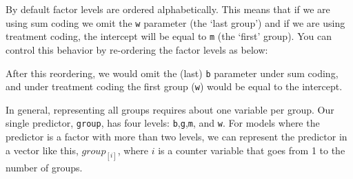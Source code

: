 \documentclass[
]{book}
\newenvironment{Shaded}{\begin{snugshade}}{\end{snugshade}}
\newcommand{\AttributeTok}[1]{\textcolor[rgb]{0.77,0.63,0.00}{#1}}
\newcommand{\CommentTok}[1]{\textcolor[rgb]{0.56,0.35,0.01}{\textit{#1}}}
\newcommand{\DocumentationTok}[1]{\textcolor[rgb]{0.56,0.35,0.01}{\textbf{\textit{#1}}}}
\newcommand{\FunctionTok}[1]{\textcolor[rgb]{0.00,0.00,0.00}{#1}}
\newcommand{\NormalTok}[1]{#1}
\newcommand{\OtherTok}[1]{\textcolor[rgb]{0.56,0.35,0.01}{#1}}
\newcommand{\SpecialCharTok}[1]{\textcolor[rgb]{0.00,0.00,0.00}{#1}}
\newcommand{\StringTok}[1]{\textcolor[rgb]{0.31,0.60,0.02}{#1}}
\begin{document}
\begin{Shaded}
\end{Shaded}

By default factor levels are ordered alphabetically. This means that if we are using sum coding we omit the \texttt{w} parameter (the `last group') and if we are using treatment coding, the intercept will be equal to \texttt{m} (the `first' group). You can control this behavior by re-ordering the factor levels as below:

\begin{Shaded}
\end{Shaded}

After this reordering, we would omit the (last) \texttt{b} parameter under sum coding, and under treatment coding the first group (\texttt{w}) would be equal to the intercept.

In general, representing all groups requires about one variable per group. Our single predictor, \texttt{group}, has four levels: \texttt{b},\texttt{g},\texttt{m}, and \texttt{w}. For models where the predictor is a factor with more than two levels, we can represent the predictor in a vector like this, \(group_{[i]}\), where \(i\) is a counter variable that goes from 1 to the number of groups.
\end{document}

